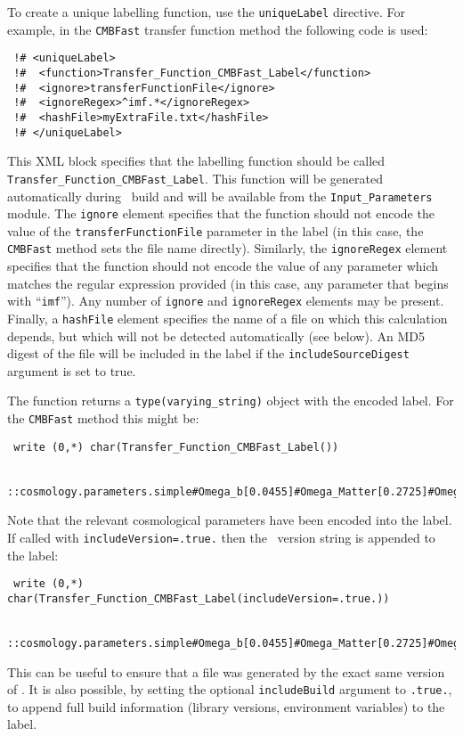 To create a unique labelling function, use the {\tt uniqueLabel} directive. For example, in the {\tt CMBFast} transfer function method the following code is used:
\begin{verbatim}
 !# <uniqueLabel>
 !#  <function>Transfer_Function_CMBFast_Label</function>
 !#  <ignore>transferFunctionFile</ignore>
 !#  <ignoreRegex>^imf.*</ignoreRegex>
 !#  <hashFile>myExtraFile.txt</hashFile>
 !# </uniqueLabel>
\end{verbatim}
This XML block specifies that the labelling function should be called {\tt Transfer\_Function\_CMBFast\_Label}. This function will be generated automatically during \glc\ build and will be available from the {\tt Input\_Parameters} module. The {\tt ignore} element specifies that the function should not encode the value of the {\tt transferFunctionFile} parameter in the label (in this case, the {\tt CMBFast} method sets the file name directly). Similarly, the {\tt ignoreRegex} element specifies that the function should not encode the value of any parameter which matches the regular expression provided (in this case, any parameter that begins with ``{\tt imf}''). Any number of {\tt ignore} and {\tt ignoreRegex} elements may be present. Finally, a {\tt hashFile} element specifies the name of a file on which this calculation depends, but which will not be detected automatically (see below). An MD5 digest of the file will be included in the label if the {\tt includeSourceDigest} argument is set to true.

The function returns a {\tt type(varying\_string)} object with the encoded label. For the {\tt CMBFast} method this might be:
\begin{verbatim}
 write (0,*) char(Transfer_Function_CMBFast_Label())
 
 ::cosmology.parameters.simple#Omega_b[0.0455]#Omega_Matter[0.2725]#Omega_DE[0.7275]#T_CMB[2.72548]#H_0[70.2]
\end{verbatim}
Note that the relevant cosmological parameters have been encoded into the label. If called with {\tt includeVersion=.true.} then the \glc\ version string is appended to the label:
\begin{verbatim}
 write (0,*) char(Transfer_Function_CMBFast_Label(includeVersion=.true.))
 
 ::cosmology.parameters.simple#Omega_b[0.0455]#Omega_Matter[0.2725]#Omega_DE[0.7275]#T_CMB[2.72548]#H_0[70.2]_v0.9.3.r2022
\end{verbatim}
This can be useful to ensure that a file was generated by the exact same version of \glc. It is also possible, by setting the optional {\tt includeBuild} argument to {\tt .true.}, to append full build information (library versions, environment variables) to the label.

